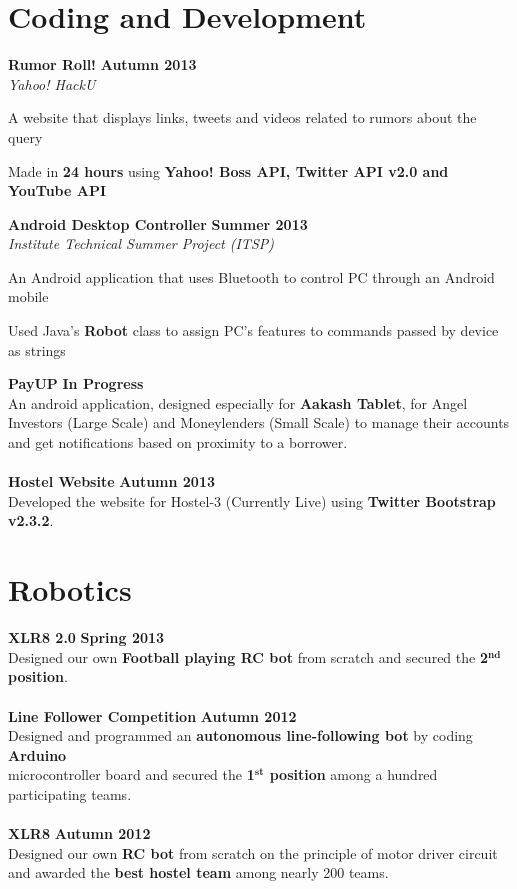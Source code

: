 \documentclass[margin,11pt]{resume}
\begin{document}
\begin{resume}
\section{\mysidestyle Coding and Development}
\textbf{Rumor Roll!} \hfill \textbf{Autumn 2013}\\
\textsl{Yahoo! HackU}
\begin{list2}
\item A website that displays links, tweets and videos related to rumors about the query
\item Made in \textbf{24 hours} using \textbf{Yahoo! Boss API, Twitter API v2.0 and YouTube API}
\end{list2}
\vspace{-2.5mm}
\textbf{Android Desktop Controller} \hfill \textbf{Summer 2013}\\
\textsl{Institute Technical Summer Project (ITSP)}
\begin{list2}
\item An Android application that uses Bluetooth to control PC through an Android mobile 
\item Used Java's \textbf{Robot} class to assign PC's features to commands passed by device as strings
\end{list2}
\vspace{-2.5mm}
\textbf{PayUP} \hfill \textbf{In Progress}\\
An android application, designed especially for \textbf{Aakash Tablet}, for Angel Investors (Large Scale) and Moneylenders (Small Scale) to manage their accounts and get notifications based on proximity to a borrower.\\
\vspace{-2.5mm}\\
\textbf{Hostel Website} \hfill \textbf{Autumn 2013}\\
Developed the website for Hostel-3 (Currently Live) using \textbf{Twitter Bootstrap v2.3.2}.

\section{\mysidestyle Robotics}
\textbf{XLR8 2.0} \hfill \textbf{Spring 2013}\\
Designed our own \textbf{Football playing RC bot} from scratch and secured the \textbf{2$^{\textbf{nd}}$ position}.\\
\vspace{-2mm} \\
\textbf{Line Follower Competition} \hfill \textbf{Autumn 2012}\\
Designed and programmed an \textbf{autonomous line-following bot} by coding \textbf{Arduino} \\ microcontroller board and secured the \textbf{1$^{\textbf{st}}$ position} among a hundred participating teams.\\
\vspace{-2mm} \\
\textbf{XLR8}  \hfill \textbf{Autumn 2012}\\
Designed our own \textbf{RC bot} from scratch on the principle of motor driver circuit and awarded the \textbf{best hostel team} among nearly 200 teams. 


\end{resume}
\end{document}
